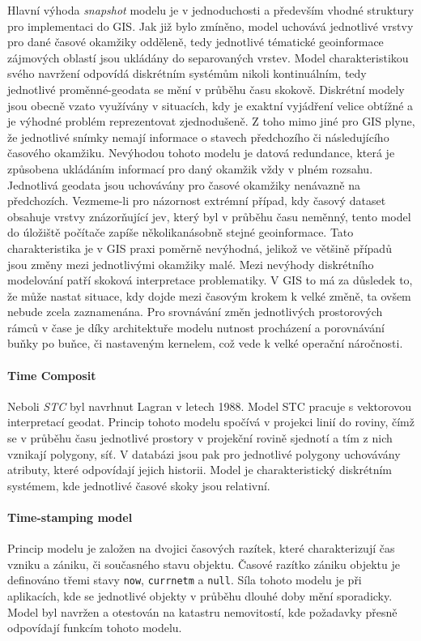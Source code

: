 \documentclass[a4paper,12pt,oneside]{report}
\begin{document}
Hlavní výhoda  \textit{snapshot} modelu je v jednoduchosti a především vhodné struktury pro implementaci do GIS. Jak již bylo zmíněno, model uchovává jednotlivé vrstvy pro dané časové okamžiky odděleně, tedy jednotlivé tématické geoinformace zájmových oblastí jsou ukládány do separovaných vrstev.  Model  charakteristikou svého navržení odpovídá diskrétním systémům nikoli kontinuálním, tedy jednotlivé proměnné-geodata se mění v průběhu času skokově. Diskrétní modely jsou obecně vzato využívány v situacích, kdy je exaktní vyjádření velice obtížné a je výhodné problém reprezentovat zjednodušeně. Z toho mimo jiné pro GIS plyne, že jednotlivé snímky nemají informace o stavech  předchozího či následujícího časového okamžiku.
Nevýhodou tohoto modelu je datová redundance, která je způsobena ukládáním informací pro daný okamžik vždy v plném rozsahu.  Jednotlivá geodata jsou uchovávány pro časové okamžiky nenávazně na předchozích. Vezmeme-li pro názornost extrémní případ, kdy časový dataset obsahuje vrstvy znázorňující jev, který byl v průběhu času neměnný, tento model do úložiště počítače zapíše několikanásobně stejné geoinformace. Tato charakteristika je v GIS praxi poměrně nevýhodná, jelikož ve většině případů jsou změny mezi jednotlivými okamžiky malé.
Mezi nevýhody diskrétního modelování patří skoková interpretace problematiky. V GIS to má za důsledek to, že může nastat situace, kdy dojde mezi časovým krokem k velké změně, ta ovšem nebude zcela zaznamenána.
Pro srovnávání změn jednotlivých prostorových rámců v čase je díky architektuře modelu nutnost procházení a porovnávání buňky po buňce, či nastaveným kernelem, což vede k velké operační náročnosti.

\paragraph*{Time Composit}
Neboli \textit{\ac{STC}} byl navrhnut Lagran\cite{lagran} v letech 1988. Model \acs{STC} pracuje s vektorovou interpretací geodat.   Princip tohoto modelu spočívá v projekci linií do roviny, čímž se v průběhu času jednotlivé prostory v projekční rovině sjednotí a tím z nich vznikají polygony, síť. V databázi jsou pak pro jednotlivé polygony uchovávány atributy, které odpovídají jejich historii.
Model je charakteristický diskrétním systémem, kde jednotlivé časové skoky jsou relativní.

\paragraph*{Time-stamping model} 
Princip modelu je založen na dvojici časových razítek, které charakterizují čas vzniku a zániku, či současného stavu objektu. Časové razítko zániku objektu je definováno třemi stavy \texttt{now}, \texttt{currnetm}  a \texttt{null}. 
Síla tohoto modelu je při aplikacích, kde se jednotlivé objekty v průběhu dlouhé doby mění sporadicky. Model byl navržen a otestován na katastru nemovitostí, kde požadavky přesně odpovídají funkcím tohoto modelu.\cite{hunter}
\end{document}
